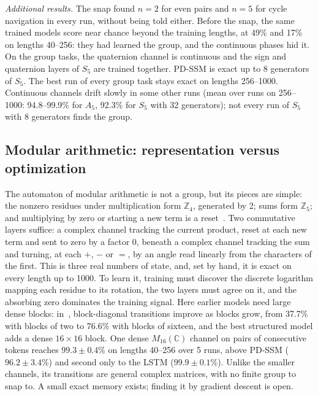 \documentclass[aps,prx,reprint,superscriptaddress,longbibliography,nofootinbib,floatfix]{revtex4-2}
\newcommand{\CC}{\mathbb{C}}
\newcommand{\ZZ}{\mathbb{Z}}
\theoremstyle{plain}
\theoremstyle{definition}
\begin{document}
\emph{Additional results.} The snap found $n=2$ for even pairs and
$n=5$ for cycle navigation in every run, without being told either. Before
the snap, the same trained models score near chance beyond the training
lengths, at 49\% and 17\% on lengths 40--256: they had learned the group,
and the continuous phases hid it. On the group tasks, the
quaternion channel is continuous and the sign and quaternion layers of $S_5$
are trained together. PD-SSM is exact up to 8 generators of $S_5$. The best
run of every group task stays exact on lengths 256--1000. Continuous
channels drift slowly in some other runs (mean over runs on 256--1000:
94.8--99.9\% for $A_5$, 92.3\% for $S_5$ with 32 generators); not every run
of $S_5$ with 8 generators finds the group.

\subsection{Modular arithmetic: representation versus optimization}\label{sm:modarith}

The automaton of modular arithmetic is not a group, but its pieces are
simple: the nonzero residues under multiplication form $\ZZ_4$, generated by
2; sums form $\ZZ_5$; and multiplying by zero or starting a new term is a
reset~\cite{krohn_rhodes}. Two commutative layers suffice: a complex channel
tracking the current product, reset at each new term and sent to zero by a
factor 0, beneath a complex channel tracking the sum and turning, at each
$+$, $-$ or $=$, by an angle read linearly from the characters of the first.
This is three real numbers of state, and, set by hand, it is exact on every
length up to 1000. To learn it, training must discover the discrete
logarithm mapping each residue to its rotation, the two layers must agree on
it, and the absorbing zero dominates the training signal. Here
earlier models need large dense blocks: in~\cite{walker_slice},
block-diagonal transitions improve as blocks grow, from 37.7\% with blocks
of two to 76.6\% with blocks of sixteen, and the best structured model adds
a dense $16\times16$ block. One dense $M_{16}(\CC)$ channel on pairs of
consecutive tokens reaches $99.3\pm0.4\%$ on lengths 40--256 over
5 runs, above PD-SSM ($96.2\pm3.4\%$) and second only to the LSTM
($99.9\pm0.1\%$). Unlike the smaller channels, its transitions are general
complex matrices, with no finite group to snap to. A small exact memory
exists; finding it by gradient descent is open.
\end{document}
